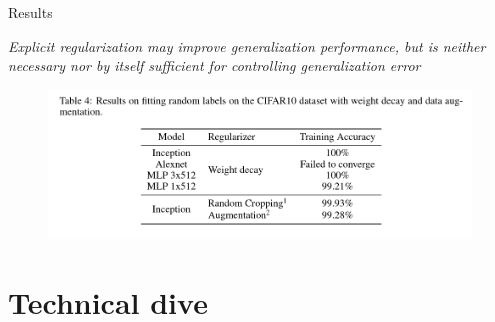 \documentclass[10pt]{beamer}
\begin{document}
\begin{frame}{Results}
	\begin{center}
			\emph{Explicit regularization may improve generalization performance, but is neither necessary nor by itself sufficient for controlling generalization error}
	\end{center}

	\begin{figure}
		\centering
		\centering
		\includegraphics[width=\linewidth]{fig2c}
		\label{fig:withreg}
	\end{figure}
\end{frame}

\section{Technical dive}
\end{document}
